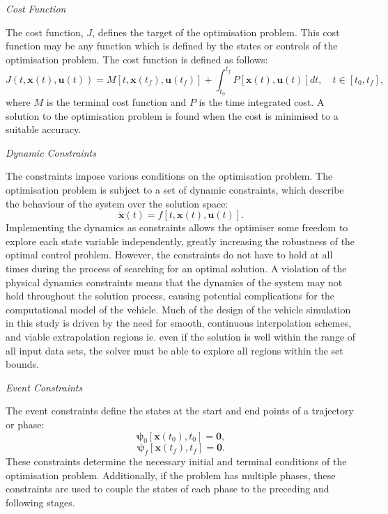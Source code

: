 \noindent \textit{Cost Function}

\noindent The cost function, $J$, defines the target of the optimisation problem. 
This cost function may be any function which is defined by the states or controls of the optimisation problem. The cost function is defined as follows:
\begin{equation} \label{eq:cost}
J(t,\textbf{x}(t),\textbf{u}(t)) = M[t,\textbf{x}(t_f),\textbf{u}(t_f)] +   \int_{t_0}^{t_f} P[\textbf{x}(t),\textbf{u}(t)] dt, \quad t \in [t_0,t_f],
\end{equation}
where $M$ is the terminal cost function and $P$ is the time integrated cost. A solution to the optimisation problem is found when the cost is minimised to a suitable accuracy. 

\noindent \textit{Dynamic Constraints}

\noindent The constraints impose various conditions on the optimisation problem.
The optimisation problem is subject to a set of dynamic constraints, which describe the behaviour of the system over the solution space:
\begin{equation} \label{eq:state}
\dot{\textbf{x}}(t) = f[t,\textbf{x}(t),\textbf{u}(t)].
\end{equation}
Implementing the dynamics as constraints allows the optimiser some freedom to explore each state variable independently, greatly increasing the robustness of the optimal control problem. However, the constraints do not have to hold at all times during the process of searching for an optimal solution. A violation of the physical dynamics constraints means that the dynamics of the system may not hold throughout the solution process, causing potential complications for the computational model of the vehicle. Much of the design of the vehicle simulation in this study is driven by the need for smooth, continuous interpolation schemes, and viable extrapolation regions ie. even if the solution is well within the range of all input data sets, the solver must be able to explore all regions within the set bounds. 

\noindent \textit{Event Constraints}

\noindent The event constraints define the states at the start and end points of a trajectory or phase:
\begin{equation}
\mathbf{\psi}_0[\textbf{x}(t_{0}), t_{0}] = \textbf{0},
\end{equation}
\begin{equation} \label{eq:2}
\mathbf{\psi}_f[\textbf{x}(t_{f}), t_{f}] = \textbf{0}.
\end{equation}
These constraints determine the necessary initial and terminal conditions of the optimisation problem. Additionally, if the problem has multiple phases, these constraints are used to couple the states of each phase to the preceding and following stages.

